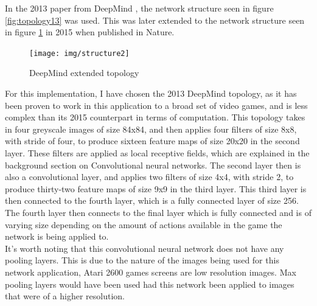 \documentclass[10pt]{article}
\begin{document}
		In the 2013 paper from DeepMind \cite{ataridrl}, the network structure seen in figure \ref{fig:topology13} was used. This was later extended to the network structure seen in figure \ref{fig:topology15} in 2015 when published in Nature.\\
		
		\begin{figure}[h]				
			\texttt{[image: img/structure2]}
			\centering
			\caption{DeepMind extended topology}
			\label{fig:topology15}
		\end{figure}
		
		For this implementation, I have chosen the 2013 DeepMind topology, as it has been proven to work in this application to a broad set of video games, and is less complex than its 2015 counterpart in terms of computation. This topology takes in four greyscale images of size 84x84, and then applies four filters of size 8x8, with stride of four, to produce sixteen feature maps of size 20x20 in the second layer. These filters are applied as local receptive fields, which are explained in the background section on Convolutional neural networks. The second layer then is also a convolutional layer, and applies two filters of size 4x4, with stride 2, to produce thirty-two feature maps of size 9x9 in the third layer. This third layer is then connected to the fourth layer, which is a fully connected layer of size 256. The fourth layer then connects to the final layer which is fully connected and is of varying size depending on the amount of actions available in the game the network is being applied to.\\
		
		It's worth noting that this convolutional neural network does not have any pooling layers. This is due to the nature of the images being used for this network application, Atari 2600 games screens are low resolution images. Max pooling layers would have been used had this network been applied to images that were of a higher resolution.\\
		
\end{document}

